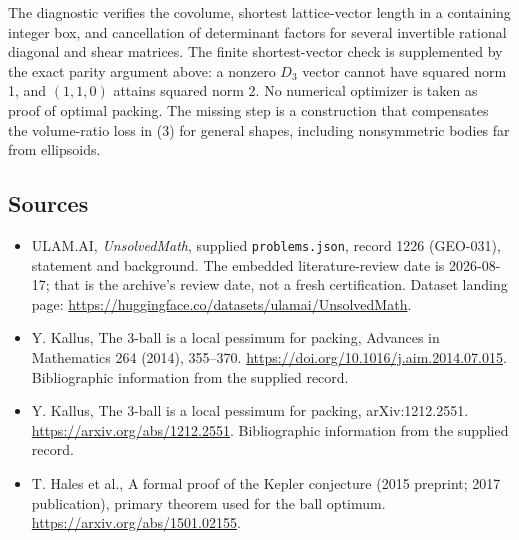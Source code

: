 \documentclass[11pt,a4paper]{article}
\begin{document}
The diagnostic verifies the covolume, shortest lattice-vector length in a containing integer box, and cancellation of determinant factors for several invertible rational diagonal and shear matrices. The finite shortest-vector check is supplemented by the exact parity argument above: a nonzero $D_3$ vector cannot have squared norm 1, and $(1,1,0)$ attains squared norm 2. No numerical optimizer is taken as proof of optimal packing. The missing step is a construction that compensates the volume-ratio loss in (3) for general shapes, including nonsymmetric bodies far from ellipsoids.

\subsection{Sources}

{\small

\begin{itemize}

\item[\hypertarget{source:1226:1}{S1}] ULAM.AI, \emph{UnsolvedMath}, supplied \texttt{problems.json}, record 1226 (GEO-031), statement and background. The embedded literature-review date is 2026-08-17; that is the archive’s review date, not a fresh certification. Dataset landing page: \url{https://huggingface.co/datasets/ulamai/UnsolvedMath}.

\item[\hypertarget{source:1226:2}{S2}] Y. Kallus, The 3-ball is a local pessimum for packing, Advances in Mathematics 264 (2014), 355–370. \url{https://doi.org/10.1016/j.aim.2014.07.015}. Bibliographic information from the supplied record.

\item[\hypertarget{source:1226:3}{S3}] Y. Kallus, The 3-ball is a local pessimum for packing, arXiv:1212.2551. \url{https://arxiv.org/abs/1212.2551}. Bibliographic information from the supplied record.

\item[R1] T. Hales et al., A formal proof of the Kepler conjecture (2015 preprint; 2017 publication), primary theorem used for the ball optimum.
\url{https://arxiv.org/abs/1501.02155}.
\end{itemize}

}

\label{end:1226}
\end{document}
